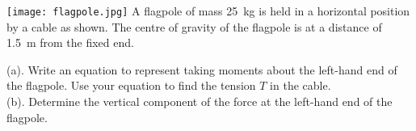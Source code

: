 \documentclass[a4paper]{tufte-handout}
\newenvironment{TaskBox} %
{\begin{tcolorbox}[breakable,colback=b1!30,colframe=b1,title=Task]} {\end{tcolorbox}}
\begin{document}
\begin{TaskBox}
\texttt{[image: flagpole.jpg]}
\newline
A flagpole of mass \SI{25}{\kg} is held in a horizontal position by a cable as shown. The centre of gravity of the flagpole is at a distance of \SI{1.5}{\m} from the fixed end.

(a). Write an equation to represent taking moments about the left-hand end of the flagpole. Use your equation to find the tension $T$ in the cable.\\
\vspace{0.5in}
(b). Determine the vertical component of the force at the left-hand end of the flagpole.\\
\vspace{0.5in}
\end{TaskBox}
\end{document}

